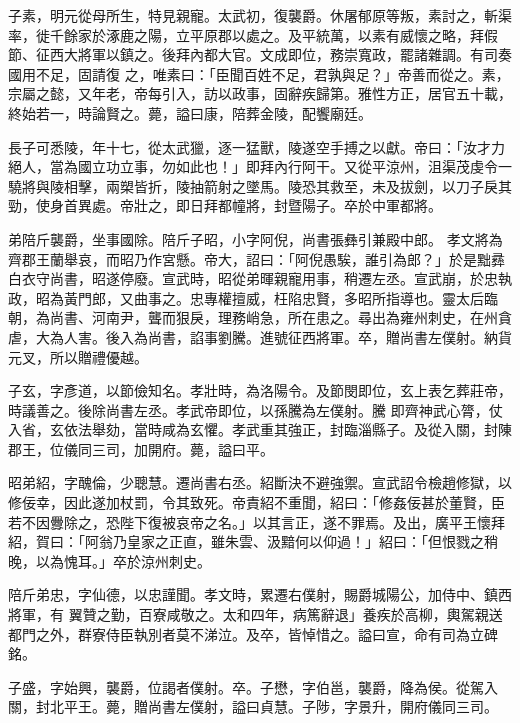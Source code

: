 \begin{pinyinscope}
 子素，明元從母所生，特見親寵。太武初，復襲爵。休屠郁原等叛，素討之，斬渠率，徙千餘家於涿鹿之陽，立平原郡以處之。及平統萬，以素有威懷之略，拜假節、征西大將軍以鎮之。後拜內都大官。文成即位，務崇寬政，罷諸雜調。有司奏國用不足，固請復
 之，唯素曰：「臣聞百姓不足，君孰與足？」帝善而從之。素，宗屬之懿，又年老，帝每引入，訪以政事，固辭疾歸第。雅性方正，居官五十載，終始若一，時論賢之。薨，謚曰康，陪葬金陵，配饗廟廷。



 長子可悉陵，年十七，從太武獵，逐一猛獸，陵遂空手搏之以獻。帝曰：「汝才力絕人，當為國立功立事，勿如此也！」即拜內行阿干。又從平涼州，沮渠茂虔令一驍將與陵相擊，兩槊皆折，陵抽箭射之墜馬。陵恐其救至，未及拔劍，以刀子戾其勁，使身首異處。帝壯之，即日拜都幢將，封暨陽子。卒於中軍都將。



 弟陪斤襲爵，坐事國除。陪斤子昭，小字阿倪，尚書張彝引兼殿中郎。
 孝文將為齊郡王蘭舉哀，而昭乃作宮懸。帝大，詔曰：「阿倪愚騃，誰引為郎？」於是黜彞白衣守尚書，昭遂停廢。宣武時，昭從弟暉親寵用事，稍遷左丞。宣武崩，於忠執政，昭為黃門郎，又曲事之。忠專權擅威，枉陷忠賢，多昭所指導也。靈太后臨朝，為尚書、河南尹，聾而狠戾，理務峭急，所在患之。尋出為雍州刺史，在州貪虐，大為人害。後入為尚書，諂事劉騰。進號征西將軍。卒，贈尚書左僕射。納貨元叉，所以贈禮優越。



 子玄，字彥道，以節儉知名。孝壯時，為洛陽令。及節閔即位，玄上表乞葬莊帝，時議善之。後除尚書左丞。孝武帝即位，以孫騰為左僕射。騰
 即齊神武心膂，仗入省，玄依法舉劾，當時咸為玄懼。孝武重其強正，封臨淄縣子。及從入關，封陳郡王，位儀同三司，加開府。薨，謚曰平。



 昭弟紹，字醜倫，少聰慧。遷尚書右丞。紹斷決不避強禦。宣武詔令檢趙修獄，以修佞幸，因此遂加杖罰，令其致死。帝責紹不重聞，紹曰：「修姦佞甚於董賢，臣若不因釁除之，恐陛下復被哀帝之名。」以其言正，遂不罪焉。及出，廣平王懷拜紹，賀曰：「阿翁乃皇家之正直，雖朱雲、汲黯何以仰過！」紹曰：「但恨戮之稍晚，以為愧耳。」卒於涼州刺史。



 陪斤弟忠，字仙德，以忠謹聞。孝文時，累遷右僕射，賜爵城陽公，加侍中、鎮西將軍，有
 翼贊之勤，百寮咸敬之。太和四年，病篤辭退」養疾於高柳，輿駕親送都門之外，群寮侍臣執別者莫不涕泣。及卒，皆悼惜之。謚曰宣，命有司為立碑銘。



 子盛，字始興，襲爵，位謁者僕射。卒。子懋，字伯邕，襲爵，降為侯。從駕入關，封北平王。薨，贈尚書左僕射，謚曰貞慧。子陟，字景升，開府儀同三司。




\end{pinyinscope}
